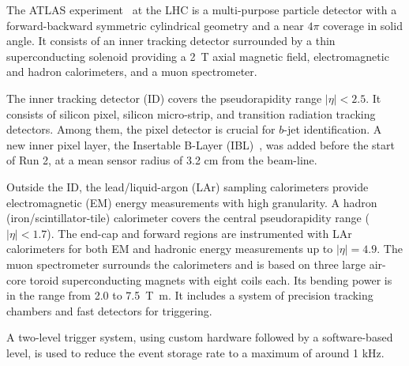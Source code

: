The ATLAS experiment~\cite{PERF-2007-01} at the LHC is a multi-purpose particle detector
with a forward-backward symmetric cylindrical geometry and a near $4\pi$ coverage in 
solid angle.
It consists of an inner tracking detector surrounded by a thin superconducting solenoid
providing a \SI{2}{\tesla} axial magnetic field, electromagnetic and hadron calorimeters, and a muon spectrometer.

The inner tracking detector (ID) covers the pseudorapidity range $|\eta| < 2.5$.
It consists of silicon pixel, silicon micro-strip, and transition radiation tracking detectors.
Among them, the pixel detector is crucial for $b$-jet identification. A new inner pixel layer, the Insertable B-Layer (IBL)~\cite{IBL, IBL_perf}, was added before the start of 
Run 2, at a mean sensor radius of 3.2 cm from the beam-line. 

Outside the ID, the lead/liquid-argon (LAr) sampling calorimeters provide electromagnetic (EM) energy measurements
with high granularity.
A hadron (iron/scintillator-tile) calorimeter covers the central pseudorapidity range ($|\eta| < 1.7$).
The end-cap and forward regions are instrumented with LAr calorimeters
for both EM and hadronic energy measurements up to $|\eta| = 4.9$.
The muon spectrometer surrounds the calorimeters and is based on
three large air-core toroid superconducting magnets with eight coils each.
Its bending power is in the range from \num{2.0} to \SI{7.5}{\tesla\metre}.
It includes a system of precision tracking chambers and fast detectors for triggering.

A two-level trigger system, using custom
hardware followed by a software-based level, is used to reduce the event storage rate to a maximum of
around 1 kHz.
